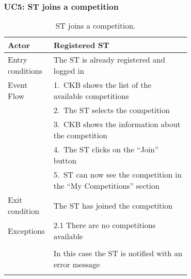 \subsubsection*{UC5: ST joins a competition}
\begin{center}
  \begin{longtable}{l|p{0.75\linewidth}}
    \hline
    Actor & Registered ST \\
    \hline
    Entry conditions & The ST is already registered and logged in  \\
    \hline
    Event Flow & 1.\ CKB shows the list of the available competitions \\
    & 2.\ The ST selects the competition \\
    & 3.\ CKB shows the information about the competition \\
    & 4.\ The ST clicks on the “Join” button \\
    & 5.\ ST can now see the competition in the “My Competitions” section \\
    \hline
    Exit condition & The ST has joined the competition \\
    \hline
    Exceptions & 2.1 There are no competitions available \\ \\
    & In this case the ST is notified with an error message \\
    \hline
    \caption{ST joins a competition.}
    \label{tab: ST_join_competition}
  \end{longtable}
\end{center}

